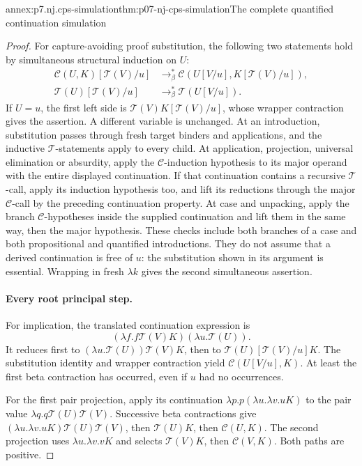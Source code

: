 \begin{annexitem}{annex:p7.nj.cps-simulation}{thm:p07-nj-cps-simulation}{The complete quantified continuation simulation}
\begin{proof}
For capture-avoiding proof substitution, the following two
statements hold by simultaneous structural induction on \(U\):
\[
\begin{aligned}
 \mathcal C(U,K)[\mathcal T(V)/u]
 &\to_\beta^*
   \mathcal C(U[V/u],K[\mathcal T(V)/u]),\\
 \mathcal T(U)[\mathcal T(V)/u]
 &\to_\beta^*\mathcal T(U[V/u]).
\end{aligned}
\]
If \(U=u\), the first left side is
\(\mathcal T(V)K[\mathcal T(V)/u]\), whose wrapper
contraction gives the assertion. A different variable is
unchanged. At an introduction, substitution passes through
fresh target binders and applications, and the inductive
\(\mathcal T\)-statements apply to every child. At application,
projection, universal elimination or absurdity, apply the
\(\mathcal C\)-induction hypothesis to its major operand
with the entire displayed continuation. If that continuation
contains a recursive \(\mathcal T\)-call, apply its
induction hypothesis too, and lift its reductions through
the major \(\mathcal C\)-call by the preceding continuation
property. At case and unpacking, apply the branch
\(\mathcal C\)-hypotheses inside the supplied continuation
and lift them in the same way, then the major hypothesis.
These checks include both branches of a case and both
propositional and quantified introductions. They do not
assume that a derived continuation is free of \(u\): the
substitution shown in its argument is essential. Wrapping
in fresh \(\lambda k\) gives the second simultaneous assertion.

\paragraph{Every root principal step.}
For implication, the translated continuation expression is
\[
 (\lambda f.f\mathcal T(V)K)(\lambda u.\mathcal T(U)).
\]
It reduces first to
\((\lambda u.\mathcal T(U))\mathcal T(V)K\), then to
\(\mathcal T(U)[\mathcal T(V)/u]K\). The substitution
identity and wrapper contraction yield
\(\mathcal C(U[V/u],K)\). At least the first beta contraction
has occurred, even if \(u\) had no occurrences.

For the first pair projection, apply its continuation
\(\lambda p.p(\lambda u.\lambda v.uK)\) to the pair value
\(\lambda q.q\mathcal T(U)\mathcal T(V)\).
Successive beta contractions give
\((\lambda u.\lambda v.uK)\mathcal T(U)\mathcal T(V)\),
then \(\mathcal T(U)K\), then \(\mathcal C(U,K)\).
The second projection uses \(\lambda u.\lambda v.vK\)
and selects \(\mathcal T(V)K\), then \(\mathcal C(V,K)\).
Both paths are positive.


\end{proof}
\end{annexitem}
